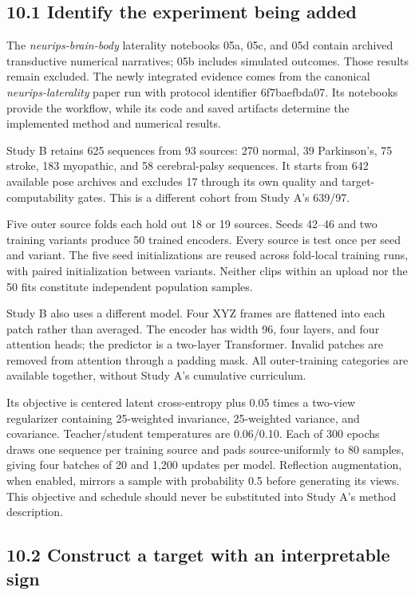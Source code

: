 \documentclass[11pt,letterpaper]{article}
\begin{document}
\subsection{10.1 Identify the experiment being
added}\label{identify-the-experiment-being-added}

The \emph{neurips-brain-body} laterality notebooks 05a, 05c, and 05d
contain archived transductive numerical narratives; 05b includes
simulated outcomes. Those results remain excluded. The newly integrated
evidence comes from the canonical \emph{neurips-laterality} paper run
with protocol identifier 6f7baefbda07. Its notebooks provide the
workflow, while its code and saved artifacts determine the implemented
method and numerical results.

Study B retains 625 sequences from 93 sources: 270 normal, 39
Parkinson's, 75 stroke, 183 myopathic, and 58 cerebral-palsy sequences.
It starts from 642 available pose archives and excludes 17 through its
own quality and target-computability gates. This is a different cohort
from Study A's 639/97.

Five outer source folds each hold out 18 or 19 sources. Seeds 42--46 and
two training variants produce 50 trained encoders. Every source is test
once per seed and variant. The five seed initializations are reused
across fold-local training runs, with paired initialization between
variants. Neither clips within an upload nor the 50 fits constitute
independent population samples.

Study B also uses a different model. Four XYZ frames are flattened into
each patch rather than averaged. The encoder has width 96, four layers,
and four attention heads; the predictor is a two-layer Transformer.
Invalid patches are removed from attention through a padding mask. All
outer-training categories are available together, without Study A's
cumulative curriculum.

Its objective is centered latent cross-entropy plus 0.05 times a
two-view regularizer containing 25-weighted invariance, 25-weighted
variance, and covariance. Teacher/student temperatures are 0.06/0.10.
Each of 300 epochs draws one sequence per training source and pads
source-uniformly to 80 samples, giving four batches of 20 and 1,200
updates per model. Reflection augmentation, when enabled, mirrors a
sample with probability 0.5 before generating its views. This objective
and schedule should never be substituted into Study A's method
description.

\subsection{10.2 Construct a target with an interpretable
sign}\label{construct-a-target-with-an-interpretable-sign}
\end{document}

